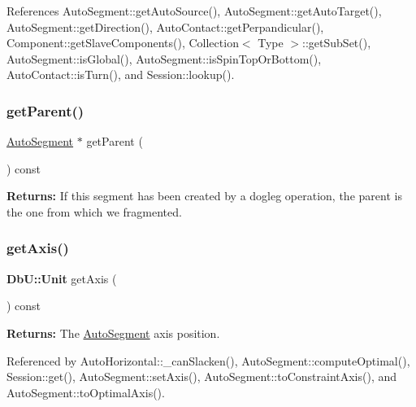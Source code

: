 References Auto\+Segment\+::get\+Auto\+Source(), Auto\+Segment\+::get\+Auto\+Target(), Auto\+Segment\+::get\+Direction(), Auto\+Contact\+::get\+Perpandicular(), Component\+::get\+Slave\+Components(), Collection$<$ Type $>$\+::get\+Sub\+Set(), Auto\+Segment\+::is\+Global(), Auto\+Segment\+::is\+Spin\+Top\+Or\+Bottom(), Auto\+Contact\+::is\+Turn(), and Session\+::lookup().

\mbox{\label{classKatabatic_1_1AutoSegment_a58c1170381b915930188608dab311442}} 
\subsubsection{\texorpdfstring{get\+Parent()}{getParent()}}
{\footnotesize\ttfamily \hyperlink{classKatabatic_1_1AutoSegment}{Auto\+Segment} $\ast$ get\+Parent (\begin{DoxyParamCaption}{ }\end{DoxyParamCaption}) const\hspace{0.3cm}{\ttfamily [inline]}}

{\bfseries Returns\+:} If this segment has been created by a dogleg operation, the parent is the one from which we fragmented. \mbox{\label{classKatabatic_1_1AutoSegment_ab5b5aaa5b318369feee6003dbad039c2}} 
\subsubsection{\texorpdfstring{get\+Axis()}{getAxis()}}
{\footnotesize\ttfamily \textbf{ Db\+U\+::\+Unit} get\+Axis (\begin{DoxyParamCaption}{ }\end{DoxyParamCaption}) const\hspace{0.3cm}{\ttfamily [inline]}}

{\bfseries Returns\+:} The \hyperlink{classKatabatic_1_1AutoSegment}{Auto\+Segment} axis position. 

Referenced by Auto\+Horizontal\+::\+\_\+can\+Slacken(), Auto\+Segment\+::compute\+Optimal(), Session\+::get(), Auto\+Segment\+::set\+Axis(), Auto\+Segment\+::to\+Constraint\+Axis(), and Auto\+Segment\+::to\+Optimal\+Axis().

